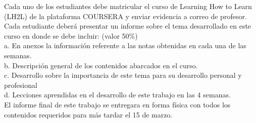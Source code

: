 \clearpage

Cada uno de los estudiantes debe matricular el curso de Learning How to Learn (LH2L) de la plataforma COURSERA y enviar evidencia a correo de profesor.\\

Cada estudiante deberá presentar un informe sobre el tema desarrollado en este curso en donde se debe incluir: (valor 50\%)\\
 a. En anexos la información referente a las notas obtenidas en cada una de las semanas.\\
 b. Descripción general de los contenidos abarcados en el curso.\\
 c. Desarrollo sobre la importancia de este tema para su desarrollo personal y profesional\\
 d. Lecciones aprendidas  en el desarrollo de este trabajo en las 4 semanas.\\

El informe final de este trabajo se entregara en forma física con todos los contenidos requeridos para más tardar el 15 de marzo.
